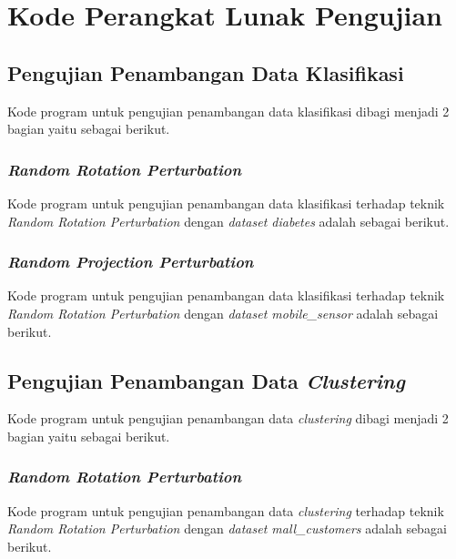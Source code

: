 \chapter{Kode Perangkat Lunak Pengujian}
\label{lamp:B}

\section{Pengujian Penambangan Data Klasifikasi}
\label{sec:pengujian-knn}

Kode program untuk pengujian penambangan data klasifikasi dibagi menjadi 2 bagian yaitu sebagai berikut.

\subsection{\textit{Random Rotation Perturbation}}
\label{subsec:knn-rotation-perturbation}
Kode program untuk pengujian penambangan data klasifikasi terhadap teknik \textit{Random Rotation Perturbation} dengan \textit{dataset diabetes} adalah sebagai berikut.


\subsection{\textit{Random Projection Perturbation}}
\label{subsec:knn-projection-perturbation}
Kode program untuk pengujian penambangan data klasifikasi terhadap teknik \textit{Random Rotation Perturbation} dengan \textit{dataset mobile\_sensor} adalah sebagai berikut.


\section{Pengujian Penambangan Data \textit{Clustering}}
\label{sec:pengujian-kmeans}

Kode program untuk pengujian penambangan data \textit{clustering} dibagi menjadi 2 bagian yaitu sebagai berikut.

\subsection{\textit{Random Rotation Perturbation}}
\label{subsec:kmeans-rotation-perturbation}
Kode program untuk pengujian penambangan data \textit{clustering} terhadap teknik \textit{Random Rotation Perturbation} dengan \textit{dataset mall\_customers} adalah sebagai berikut.


